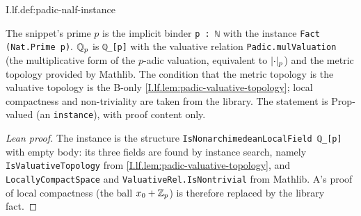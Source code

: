 \begin{definition}
\end{definition}
\begin{tfformal}{I.lf.def:padic-nalf-instance}
\begin{tffidelity}
The snippet's prime $p$ is the implicit binder \texttt{p : ℕ} with the instance \texttt{Fact (Nat.Prime p)}. $\mathbb{Q}_p$ is \texttt{ℚ\_[p]} with the valuative relation \texttt{Padic.mulValuation} (the multiplicative form of the $p$-adic valuation, equivalent to $\lvert\cdot\rvert_p$) and the metric topology provided by Mathlib. The condition that the metric topology is the valuative topology is the B-only \cref{I.lf.lem:padic-valuative-topology}; local compactness and non-triviality are taken from the library. The statement is Prop-valued (an \texttt{instance}), with proof content only.
\end{tffidelity}
\end{tfformal}
\begin{proof}[Lean proof]
The instance is the structure \texttt{IsNonarchimedeanLocalField ℚ\_[p]} with empty body: its three fields are found by instance search, namely \texttt{IsValuativeTopology} from \cref{I.lf.lem:padic-valuative-topology}, and \texttt{LocallyCompactSpace} and \texttt{ValuativeRel.IsNontrivial} from Mathlib. A's proof of local compactness (the ball $x_0+\mathbb{Z}_p$) is therefore replaced by the library fact.
\end{proof}

